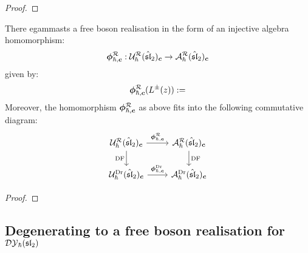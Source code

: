             \begin{proof}
                
            \end{proof}
        \begin{proposition} \label{prop: free_boson_realisation_quantum_affine_sl_2_R_matrix_presentation}
            There egammasts a free boson realisation in the form of an injective algebra homomorphism:
                $$\boldsymbol{\phi}_{\hbar, \boldsymbol{c}}^{\mathcal{R}}: \mathcal{U}_{\hbar}^{\mathcal{R}}(\hat{\mathfrak{sl}}_2)_{\boldsymbol{c}} \to \mathcal{A}_{\hbar}^{\mathcal{R}}(\hat{\mathfrak{sl}}_2)_{\boldsymbol{c}}$$
            given by:
                $$\boldsymbol{\phi}_{\hbar, \boldsymbol{c}}^{\mathcal{R}}( L^{\pm}(z) ) := $$
            Moreover, the homomorphism $\boldsymbol{\phi}_{\hbar, \boldsymbol{c}}^{\mathcal{R}}$ as above fits into the following commutative diagram:
                $$
                    \begin{tikzcd}
                	{\calU_{\hbar}^{\calR}(\hat{\sl}_2)_{\level}} & {\calA_{\hbar}^{\calR}(\hat{\sl}_2)_{\level}} \\
                	{\calU_{\hbar}^{\current}(\hat{\sl}_2)_{\level}} & {\calA_{\hbar}^{\current}(\hat{\sl}_2)_{\level}}
                	\arrow["{\freeboson_{\hbar, \level}^{\calR}}", from=1-1, to=1-2]
                	\arrow["\DF"', from=1-1, to=2-1]
                	\arrow["\DF", from=1-2, to=2-2]
                	\arrow["{\freeboson_{\hbar, \level}^{\current}}", from=2-1, to=2-2]
                    \end{tikzcd}
                $$
        \end{proposition}
            \begin{proof}
                
            \end{proof}

    \subsection{\texorpdfstring{Degenerating to a free boson realisation for $\mathcal{DY}_{\hbar}(\mathfrak{sl}_2)$}{}}